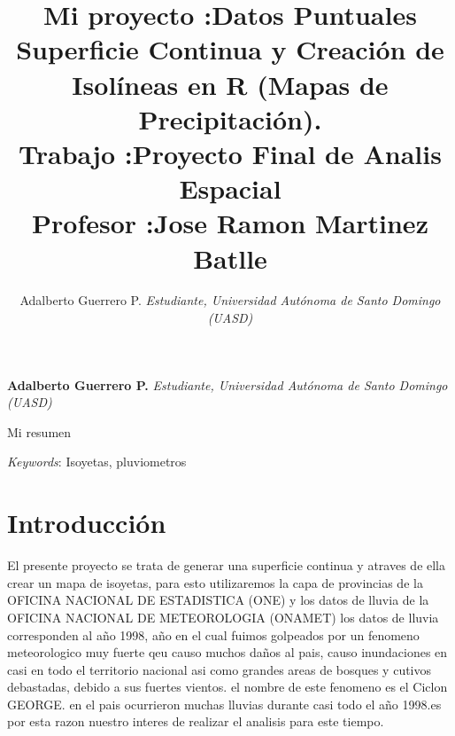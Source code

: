 \documentclass[11pt,]{article}
\title{Mi proyecto :Datos Puntuales Superficie Continua y Creación de Isolíneas
en R (Mapas de Precipitación).\\
Trabajo :Proyecto Final de Analis Espacial\\
Profesor :Jose Ramon Martinez Batlle  }
\author{\Large Adalberto Guerrero P.\vspace{0.05in} \newline\normalsize\emph{Estudiante, Universidad Autónoma de Santo Domingo (UASD)}  }
\date{}
\newcommand*{\authorfont}{\fontfamily{phv}\selectfont}
\renewenvironment{abstract}
 {{%
    \setlength{\leftmargin}{0mm}
    \setlength{\rightmargin}{\leftmargin}%
  }%
  \relax}
 {\endlist}
\begin{document}
	
%

{%
\setlength{\parindent}{0pt}
\thispagestyle{plain}
{\fontsize{18}{20}\selectfont\raggedright 
\maketitle  %

}

{
   \vskip 13.5pt\relax \normalsize\fontsize{11}{12} 
\textbf{\authorfont Adalberto Guerrero P.} \hskip 15pt \emph{\small Estudiante, Universidad Autónoma de Santo Domingo (UASD)}   

}

}








\begin{abstract}

    \hbox{\vrule height .2pt width 39.14pc}

    \vskip 8.5pt %

\noindent Mi resumen


\vskip 8.5pt \noindent \emph{Keywords}: Isoyetas, pluviometros \par

    \hbox{\vrule height .2pt width 39.14pc}



\end{abstract}


\vskip 6.5pt


\noindent  \section{Introducción}\label{introducciuxf3n}

El presente proyecto se trata de generar una superficie continua y
atraves de ella crear un mapa de isoyetas, para esto utilizaremos la
capa de provincias de la OFICINA NACIONAL DE ESTADISTICA (ONE) y los
datos de lluvia de la OFICINA NACIONAL DE METEOROLOGIA (ONAMET) los
datos de lluvia corresponden al año 1998, año en el cual fuimos
golpeados por un fenomeno meteorologico muy fuerte qeu causo muchos
daños al pais, causo inundaciones en casi en todo el territorio nacional
asi como grandes areas de bosques y cutivos debastadas, debido a sus
fuertes vientos. el nombre de este fenomeno es el Ciclon GEORGE. en el
pais ocurrieron muchas lluvias durante casi todo el año 1998.es por esta
razon nuestro interes de realizar el analisis para este tiempo.
\end{document}
